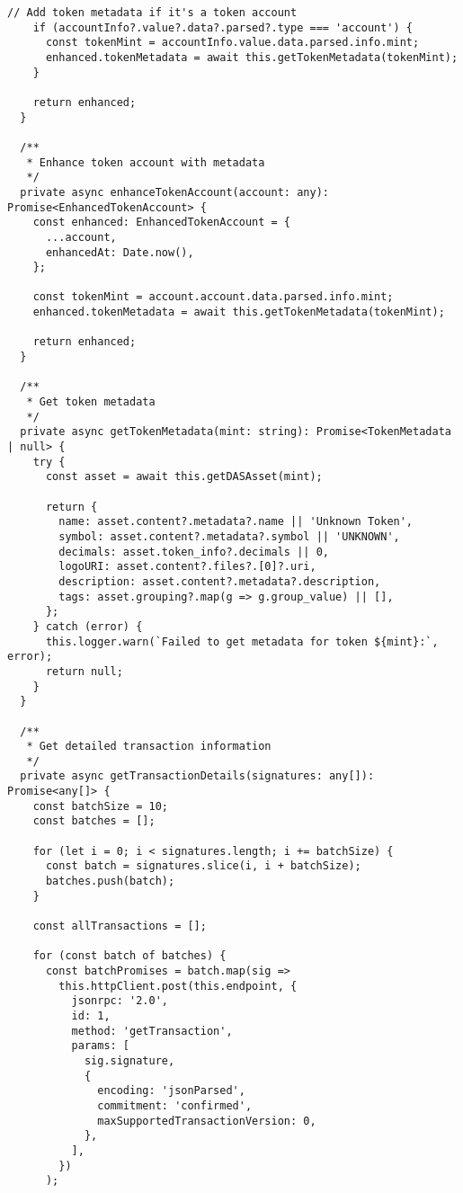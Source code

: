 \documentclass[11pt,a4paper]{article}
\begin{document}
\begin{lstlisting}[style=typescript, caption=Helius RPC Service with Advanced Features]
    // Add token metadata if it's a token account
    if (accountInfo?.value?.data?.parsed?.type === 'account') {
      const tokenMint = accountInfo.value.data.parsed.info.mint;
      enhanced.tokenMetadata = await this.getTokenMetadata(tokenMint);
    }

    return enhanced;
  }

  /**
   * Enhance token account with metadata
   */
  private async enhanceTokenAccount(account: any): Promise<EnhancedTokenAccount> {
    const enhanced: EnhancedTokenAccount = {
      ...account,
      enhancedAt: Date.now(),
    };

    const tokenMint = account.account.data.parsed.info.mint;
    enhanced.tokenMetadata = await this.getTokenMetadata(tokenMint);

    return enhanced;
  }

  /**
   * Get token metadata
   */
  private async getTokenMetadata(mint: string): Promise<TokenMetadata | null> {
    try {
      const asset = await this.getDASAsset(mint);
      
      return {
        name: asset.content?.metadata?.name || 'Unknown Token',
        symbol: asset.content?.metadata?.symbol || 'UNKNOWN',
        decimals: asset.token_info?.decimals || 0,
        logoURI: asset.content?.files?.[0]?.uri,
        description: asset.content?.metadata?.description,
        tags: asset.grouping?.map(g => g.group_value) || [],
      };
    } catch (error) {
      this.logger.warn(`Failed to get metadata for token ${mint}:`, error);
      return null;
    }
  }

  /**
   * Get detailed transaction information
   */
  private async getTransactionDetails(signatures: any[]): Promise<any[]> {
    const batchSize = 10;
    const batches = [];
    
    for (let i = 0; i < signatures.length; i += batchSize) {
      const batch = signatures.slice(i, i + batchSize);
      batches.push(batch);
    }

    const allTransactions = [];
    
    for (const batch of batches) {
      const batchPromises = batch.map(sig => 
        this.httpClient.post(this.endpoint, {
          jsonrpc: '2.0',
          id: 1,
          method: 'getTransaction',
          params: [
            sig.signature,
            {
              encoding: 'jsonParsed',
              commitment: 'confirmed',
              maxSupportedTransactionVersion: 0,
            },
          ],
        })
      );


\end{lstlisting}
\end{document}
